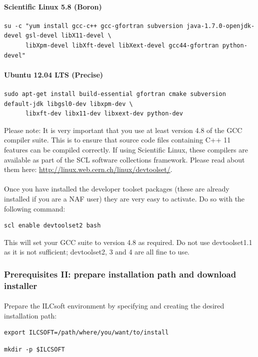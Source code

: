 \documentclass[11pt]{article}
\begin{document}
\paragraph{Scientific Linux 5.8 (Boron)}
\begin{verbatim}
su -c "yum install gcc-c++ gcc-gfortran subversion java-1.7.0-openjdk-devel gsl-devel libX11-devel \
      libXpm-devel libXft-devel libXext-devel gcc44-gfortran python-devel"
\end{verbatim}
\paragraph{Ubuntu 12.04 LTS (Precise)}
\begin{verbatim}
sudo apt-get install build-essential gfortran cmake subversion default-jdk libgsl0-dev libxpm-dev \
      libxft-dev libx11-dev libxext-dev python-dev
\end{verbatim}
Please note: It is very important that you use at least version 4.8 of the GCC compiler suite. This is to ensure that source code files containing C++ 11 features can be compiled correctly. If using Scientific Linux, these compilers are available as part of the SCL software collections framework. Please read about them here: \url{http://linux.web.cern.ch/linux/devtoolset/}.
\paragraph{}
Once you have installed the developer toolset packages (these are already installed if you are a NAF user) they are very easy to activate. Do so with the following command:
\begin{verbatim}
scl enable devtoolset2 bash
\end{verbatim}
This will set your GCC suite to version 4.8 as required. Do not use devtoolset1.1 as it is not sufficient; devtoolset2, 3 and 4 are all fine to use.
\subsubsection{Prerequisites II: prepare installation path and download installer}
\paragraph{}
Prepare the ILCsoft environment by specifying and creating the desired installation path:\\
\begin{verbatim}
export ILCSOFT=/path/where/you/want/to/install
\end{verbatim}
\begin{verbatim}
mkdir -p $ILCSOFT
\end{verbatim}
\end{document}
